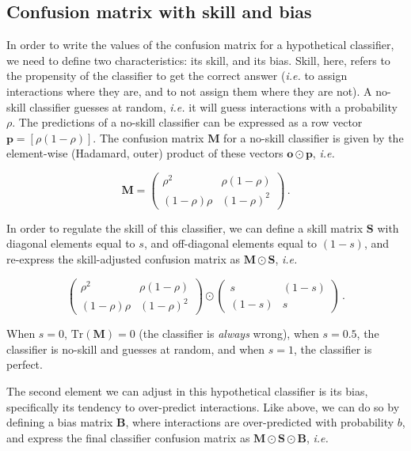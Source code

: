 \documentclass[11pt]{article}
\begin{document}
\hypertarget{confusion-matrix-with-skill-and-bias}{%
\subsection{Confusion matrix with skill and
bias}\label{confusion-matrix-with-skill-and-bias}}

In order to write the values of the confusion matrix for a hypothetical
classifier, we need to define two characteristics: its skill, and its
bias. Skill, here, refers to the propensity of the classifier to get the
correct answer (\emph{i.e.} to assign interactions where they are, and
to not assign them where they are not). A no-skill classifier guesses at
random, \emph{i.e.} it will guess interactions with a probability
\(\rho\). The predictions of a no-skill classifier can be expressed as a
row vector \(\mathbf{p} = [\rho (1-\rho)]\). The confusion matrix
\(\mathbf{M}\) for a no-skill classifier is given by the element-wise
(Hadamard, outer) product of these vectors
\(\mathbf{o} \odot \mathbf{p}\), \emph{i.e.}

\[
\mathbf{M} = \begin{pmatrix}
    \rho^2 & \rho (1-\rho) \\
    (1-\rho) \rho & (1-\rho)^2
\end{pmatrix} \,.
\]

In order to regulate the skill of this classifier, we can define a skill
matrix \(\mathbf{S}\) with diagonal elements equal to \(s\), and
off-diagonal elements equal to \((1-s)\), and re-express the
skill-adjusted confusion matrix as \(\mathbf{M} \odot \mathbf{S}\),
\emph{i.e.}

\[
\begin{pmatrix}
    \rho^2 & \rho (1-\rho) \\
    (1-\rho) \rho & (1-\rho)^2
\end{pmatrix} \odot \begin{pmatrix}
    s & (1-s) \\
    (1-s) & s
\end{pmatrix} \,.
\]

When \(s=0\), \(\text{Tr}(\mathbf{M}) = 0\) (the classifier is
\emph{always} wrong), when \(s=0.5\), the classifier is no-skill and
guesses at random, and when \(s=1\), the classifier is perfect.

The second element we can adjust in this hypothetical classifier is its
bias, specifically its tendency to over-predict interactions. Like
above, we can do so by defining a bias matrix \(\mathbf{B}\), where
interactions are over-predicted with probability \(b\), and express the
final classifier confusion matrix as
\(\mathbf{M}\odot \mathbf{S}\odot \mathbf{B}\), \emph{i.e.}
\end{document}
